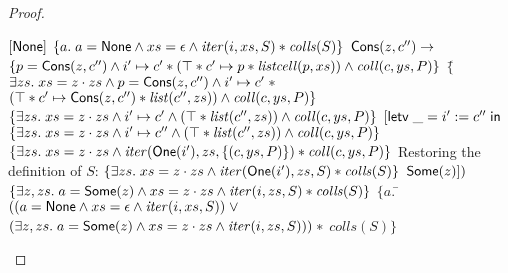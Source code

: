 \begin{proof}
\begin{itemize}
\begin{specification}
\nextline \> \> $[\mathsf{None}]$ 
\nextline \> \> $\{{a.\; a = \mathsf{None} \land xs = \epsilon \land \mathit{iter}(i, xs, S) * \mathit{colls}(S)}\}$
\nextline \> $\mathsf{Cons}(z, c'') \to$ 
\nextline \> \> $\{{p = \mathsf{Cons}(z, c'') \land i' \mapsto c' * (\top * c' \mapsto p * \mathit{listcell}(p, xs)) \land \mathit{coll}(c, ys, P)}\}$
\nextline \> \> $\{$\=$\exists zs.\; xs = z\cdot zs \land p = \mathsf{Cons}(z, c'') \land i' \mapsto c' \;*$ 
\nextline \> \>     \>$(\top * c' \mapsto \mathsf{Cons}(z, c'') * \mathit{list}(c'', zs)) \land \mathit{coll}(c, ys, P)\}$
\nextline \> \> $\{{\exists zs.\; xs = z\cdot zs \land i' \mapsto c'\land
                       (\top * \mathit{list}(c'', zs)) \land \mathit{coll}(c, ys, P)}\}$
\nextline \> \> $[\mathsf{letv}\;\_ = i' := c''\;\mathsf{in}\;$ 
\nextline \> \> $\{{\exists zs.\; xs = z\cdot zs \land i' \mapsto c'' \land
                       (\top * \mathit{list}(c'', zs)) \land \mathit{coll}(c, ys, P)}\}$
\nextline \> \> $\{{\exists zs.\; xs = z\cdot zs \land
                        \mathit{iter}(\mathsf{One}(i'), zs, \{{(c, ys, P)}\}) * \mathit{coll}(c, ys, P)}\}$ 
\nextline \> \> Restoring the definition of $S$:
\nextline \> \> $\{{\exists zs.\; xs = z\cdot zs \land
                        \mathit{iter}(\mathsf{One}(i'), zs, S) * \mathit{colls}(S)}\}$ 
\nextline \> \> $\mathsf{Some}(z)])$ 
\nextline \> \> $\{{\exists z, zs.\; a = \mathsf{Some}(z) \land xs = z\cdot zs \land
                        \mathit{iter}(i, zs, S) * \mathit{colls}(S)}\}$ 
\nextline $\{a.\;$\=$((a = \mathsf{None} \land xs = \epsilon \land \mathit{iter}(i, xs, S)) \; \vee$ 
\nextline         \>$(\exists z, zs.\; a = \mathsf{Some}(z) \land xs = z\cdot zs \land \mathit{iter}(i, zs, S))) \;*$ 
\nextline         \>$\mathit{colls}(S)\}$
\end{specification}


\end{itemize}
\end{proof}
